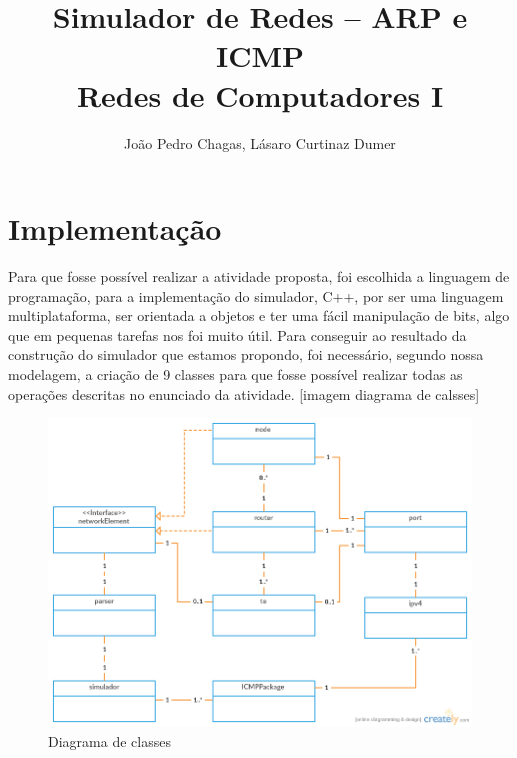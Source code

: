 \documentclass[12pt]{article}
\title{Simulador de Redes -- ARP e ICMP\\ Redes de Computadores I}
\author{João Pedro Chagas\inst{1}, Lásaro Curtinaz Dumer\inst{1}}
\begin{document}
 
\maketitle



\section{Implementação}

Para que fosse possível realizar a atividade proposta, foi escolhida a linguagem de programação, para a implementação do simulador, C++, por ser uma linguagem multiplataforma, ser orientada a objetos e ter uma fácil manipulação de bits, algo que em pequenas tarefas nos foi muito útil. Para conseguir ao resultado da construção do simulador que estamos propondo, foi necessário, segundo nossa modelagem, a criação de 9 classes para que fosse possível realizar todas as operações descritas no enunciado da atividade.
[imagem diagrama de calsses]

\begin{figure}[ht]
\centering
\includegraphics[width=1\textwidth]{DiagramaClasses.png}
\caption{Diagrama de classes}
\label{fig:DiagramaClasses}
\end{figure}
\end{document}
